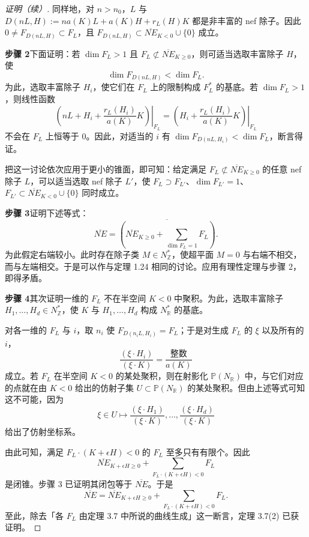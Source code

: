 \begin{proof}[证明（续）]
同样地，对 $n>n_0$，$L$ 与 $D(nL,H):=na(K)L+a(K)H+r_L(H)K$ 都是非丰富的 nef 除子。因此 $0\neq F_{D(nL,H)}\subset F_L$，且 $F_{D(nL,H)}\subset\overline{NE}_{K<0}\cup\{0\}$ 成立。

\par\medskip\noindent\textbf{步骤 2}\quad 下面证明：若 $\dim F_L>1$ 且 $F_L\not\subset\overline{NE}_{K\geq 0}$，则可适当选取丰富除子 $H$，使
\[
\dim F_{D(nL,H)}<\dim F_L.
\]
为此，选取丰富除子 $H_i$，使它们在 $F_L$ 上的限制构成 $F_L^*$ 的基底。若 $\dim F_L>1$，则线性函数
\[
\left.\left(nL+H_i+\frac{r_L(H_i)}{a(K)}K\right)\right|_{F_L}=\left.\left(H_i+\frac{r_L(H_i)}{a(K)}K\right)\right|_{F_L}
\]
不会在 $F_L$ 上恒等于 $0$。因此，对适当的 $i$ 有 $\dim F_{D(nL,H_i)}<\dim F_L$，断言得证。

把这一讨论依次应用于更小的锥面，即可知：给定满足 $F_L\not\subset\overline{NE}_{K\geq 0}$ 的任意 nef 除子 $L$，可以适当选取 nef 除子 $L'$，使 $F_L\supset F_{L'}$、$\dim F_{L'}=1$、$F_{L'}\subset\overline{NE}_{K<0}\cup\{0\}$ 同时成立。

\par\medskip\noindent\textbf{步骤 3}\quad 证明下述等式：
\[
\overline{NE}=\overline{\left(\overline{NE}_{K\geq 0}+\sum_{\dim F_L=1}F_L\right)}.
\]
为此假定右端较小。此时存在除子类 $M\in N_{\mathbb{Z}}^*$，使超平面 $M=0$ 与右端不相交，而与左端相交。于是可以作与定理 1.24 相同的讨论。应用有理性定理与步骤 2，即得矛盾。

\par\medskip\noindent\textbf{步骤 4}\quad 其次证明一维的 $F_L$ 不在半空间 $K<0$ 中聚积。为此，选取丰富除子 $H_1,\dots,H_d\in N_{\mathbb{Z}}^*$，使 $K$ 与 $H_1,\dots,H_d$ 构成 $N_{\mathbb{R}}^*$ 的基底。

对各一维的 $F_L$ 与 $i$，取 $n_i$ 使 $F_{D(n_iL,H_i)}=F_L$；于是对生成 $F_L$ 的 $\xi$ 以及所有的 $i$，
\[
\frac{(\xi\cdot H_i)}{(\xi\cdot K)}=\frac{\text{整数}}{a(K)}
\]
成立。若 $F_L$ 在半空间 $K<0$ 的某处聚积，则在射影化 $\mathbb{P}(N_{\mathbb{R}})$ 中，与它们对应的点就在由 $K<0$ 给出的仿射子集 $U\subset\mathbb{P}(N_{\mathbb{R}})$ 的某处聚积。但由上述等式可知这不可能，因为
\[
\xi\in U\mapsto\frac{(\xi\cdot H_1)}{(\xi\cdot K)},\dots,\frac{(\xi\cdot H_d)}{(\xi\cdot K)}
\]
给出了仿射坐标系。

由此可知，满足 $F_L\cdot(K+\epsilon H)<0$ 的 $F_L$ 至多只有有限个。因此
\[
\overline{NE}_{K+\epsilon H\geq 0}+\sum_{F_L\cdot(K+\epsilon H)<0}F_L
\]
是闭锥。步骤 3 已证明其闭包等于 $\overline{NE}$。于是
\[
\overline{NE}=\overline{NE}_{K+\epsilon H\geq 0}+\sum_{F_L\cdot(K+\epsilon H)<0}F_L.
\]
至此，除去「各 $F_L$ 由定理 3.7 中所说的曲线生成」这一断言，定理 3.7(2) 已获证明。


\end{proof}
